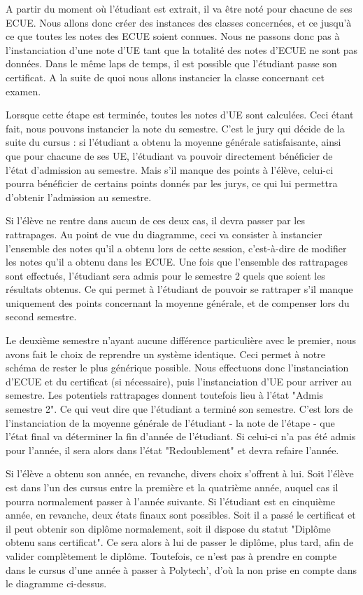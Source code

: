 \documentclass[letter, 11pt] {article}
\begin{document}
	A partir du moment où l'étudiant est extrait, il va être noté pour chacune de ses ECUE. Nous allons donc créer des instances des classes concernées, et ce jusqu'à ce que toutes les notes des ECUE soient connues. Nous ne passons donc pas à l'instanciation d'une note d'UE tant que la totalité des notes d'ECUE ne sont pas données. Dans le même laps de temps, il est possible que l'étudiant passe son certificat. A la suite de quoi nous allons instancier la classe concernant cet examen.

	Lorsque cette étape est terminée, toutes les notes d'UE sont calculées. Ceci étant fait, nous pouvons instancier la note du semestre.
	C'est le jury qui décide de la suite du cursus : si l'étudiant a obtenu la moyenne générale satisfaisante, ainsi que pour chacune de ses UE, l'étudiant va pouvoir directement bénéficier de l'état d'admission au semestre.
	Mais s'il manque des points à l'élève, celui-ci pourra bénéficier de certains points donnés par les jurys, ce qui lui permettra d'obtenir l'admission au semestre.

	Si l'élève ne rentre dans aucun de ces deux cas, il devra passer par les rattrapages. Au point de vue du diagramme, ceci va consister à instancier l'ensemble des notes qu'il a obtenu lors de cette session, c'est-à-dire de modifier les notes qu'il a obtenu dans les ECUE. Une fois que l'ensemble des rattrapages sont effectués, l'étudiant sera admis pour le semestre 2 quels que soient les résultats obtenus. Ce qui permet à l'étudiant de pouvoir se rattraper s'il manque uniquement des points concernant la moyenne générale, et de compenser lors du second semestre.

	Le deuxième semestre n'ayant aucune différence particulière avec le premier, nous avons fait le choix de reprendre un système identique. Ceci permet à notre schéma de rester le plus générique possible. Nous effectuons donc l'instanciation d'ECUE et du certificat (si nécessaire), puis l'instanciation d'UE pour arriver au semestre. Les potentiels rattrapages donnent toutefois lieu à l'état "Admis semestre 2". Ce qui veut dire que l'étudiant a terminé son semestre. C'est lors de l'instanciation de la moyenne générale de l'étudiant - la note de l'étape - que l'état final va déterminer la fin d'année de l'étudiant.
	Si celui-ci n'a pas été admis pour l'année, il sera alors dans l'état "Redoublement" et devra refaire l'année.
	
	Si l'élève a obtenu son année, en revanche, divers choix s'offrent à lui. Soit l'élève est dans l'un des cursus entre la première et la quatrième année, auquel cas il pourra normalement passer à l'année suivante.
	Si l'étudiant est en cinquième année, en revanche, deux états finaux sont possibles. Soit il a passé le certificat et il peut obtenir son diplôme normalement, soit il dispose du statut "Diplôme obtenu sans certificat". Ce sera alors à lui de passer le diplôme, plus tard, afin de valider complètement le diplôme. Toutefois, ce n'est pas à prendre en compte dans le cursus d'une année à passer à Polytech', d'où la non prise en compte dans le diagramme ci-dessus.
\end{document}

